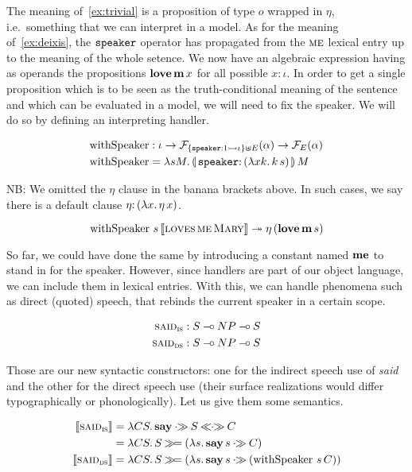 \documentclass{llncs}
\begin{document}
The meaning of~\eqref{ex:trivial} is a proposition of type $o$ wrapped in
$\eta$, i.e.\ something that we can interpret in a model. As for the
meaning of~\eqref{ex:deixis}, the $\mathtt{speaker}$ operator has propagated
from the $\textsc{me}$ lexical entry up to the meaning of the whole
setence. We now have an algebraic expression having as operands the
propositions $\textbf{love}\,\textbf{m}\,x$ for all possible $x :
\iota$. In order to get a single proposition which is to be seen as the
truth-conditional meaning of the sentence and which can be evaluated in a
model, we will need to fix the speaker. We will do so by defining an
interpreting handler.

\begin{align*}
  \withSpeaker &: \iota \to \FF_{\{\typedop{speaker}{1}{\iota}\} \uplus
    E}(\alpha) \to \FF_E(\alpha) \\
  \withSpeaker &= \lam{s M}{\ap{\banana{\onto{\op{speaker}}{(\lam{x k}{\ap{k}{s}})}}}{M}}
\end{align*}

NB: We omitted the $\eta$ clause in the banana brackets above. In such
cases, we say there is a default clause $\onto{\eta}{(\lam{x}{\etaE{x}})}$.

$$
  \operatorname{withSpeaker}\,s\,\llbracket \textsc{loves}\,\textsc{me}\,\textsc{Mary} \rrbracket \twoheadrightarrow
  \eta\,(\textbf{love}\,\textbf{m}\,s)
$$

So far, we could have done the same by introducing a constant named
$\textbf{me}$ to stand in for the speaker. However, since handlers are part of
our object language, we can include them in lexical entries. With this, we
can handle phenomena such as direct (quoted) speech, that rebinds the
current speaker in a certain scope.

\begin{align*}
  \textsc{said}_{\textsc{is}} &: S \mathbin{{-}\mkern-3.5mu{\circ}} NP \mathbin{{-}\mkern-3.5mu{\circ}} S \\
  \textsc{said}_{\textsc{ds}} &: S \mathbin{{-}\mkern-3.5mu{\circ}} NP \mathbin{{-}\mkern-3.5mu{\circ}} S
\end{align*}

Those are our new syntactic constructors: one for the indirect speech use
of \emph{said} and the other for the direct speech use (their surface
realizations would differ typographically or phonologically). Let us give
them some semantics.

\begin{align*}
  \sem{\abs{said}_{\abs{is}}} &= \lam{C S}{\obj{say} \apr S \aplr C} \\
                             &= \lam{C S}{S \hsbind (\lam{s}{\ap{\obj{say}}{s} \apr C})} \\
  \sem{\abs{said}_{\abs{ds}}} &= \lam{C S}{S \hsbind (\lam{s}{\ap{\obj{say}}{s} \apr (\app{\withSpeaker}{s}{C})})}
\end{align*}
\end{document}
